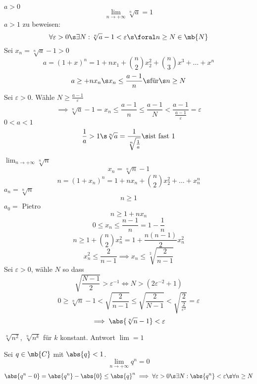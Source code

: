 \begin{Bsp}
  $a>0$
  \[\lim_{n\to+\infty}\sqrt[n]{a}=1\]
  $a>1$ zu beweisen:
  \[\forall \varepsilon>0 \s\exists N:\sqrt[n]{a}-1<\varepsilon\s\foral n\geq N\in\mb{N}\]
  Sei $x_n=\sqrt[n]{a}-1>0$
  \[a=(1+x)^n=1+nx_1+\binom{n}{2}x^2_2+\binom{n}{3}x^3+\dots+x^n\]
  \[a\geq +nx_n\s x_n\leq\frac{a-1}{n}\s\text{für}\s n\geq N\]
  Sei $\varepsilon>0$. Wähle $N\geq \frac{a-1}{\varepsilon}$
  \[\implies\sqrt[n]{a}-1=x_n\leq\frac{a-1}{n}\leq\frac{a-1}{N}<\frac{a-1}{\frac{a-1}{\varepsilon}}=\varepsilon\]
  $0<a<1$
  \[\frac{1}{a}>1\s\sqrt[n]{a}=\frac{1}{\sqrt[n]{\frac{1}{a}}}\s\text{ist fast 1}\]
\end{Bsp}
\begin{Bsp}
  $\lim_{n\to+\infty}\sqrt[n]{n}$
  \[x_n=\sqrt[n]{n}-1\]
  \[n=(1+x_n)^n=1+nx_n+\binom{n}{2}x_2^2+\dots+x_n^n\]
  $a_n=\sqrt[n]{n}$
  \[n\geq 1\]
  $a_0=$ Pietro %
  \[n\geq 1+nx_n\]
  \[0\leq x_n\leq\frac{n-1}{n}=1-\frac{1}{n}\]
  \[n\geq1+\binom{n}{2} x_n^2=1+\frac{n(n-1)}{2}x_n^2 \]
  \[x_n^2\leq\frac{2}{n-1}\implies x_n\leq \sqrt[2]{\frac{2}{n-1}}\]
  Sei $\varepsilon>0$, wähle $N$ so dass
  \[\sqrt{\frac{N-1}{2}}>\varepsilon^{-1}\iff N>\left( 2\varepsilon^{-2}+1 \right)\]
  \[0\geq\sqrt[n]{n}-1<\sqrt{\frac{2}{n-1}}\leq\sqrt{\frac{2}{N-1}}<\sqrt{\frac{2}{\frac{2}{\varepsilon^2}}}=\varepsilon\]
  \[\implies \abs{\sqrt[n]{n}-1}<\varepsilon\]
\end{Bsp}
\begin{Ueb}
  $\sqrt[n]{n^2}$, $\sqrt[n]{n^k}$ für $k$ konstant. Antwort $\lim = 1$
\end{Ueb}
\begin{Bsp}
  Sei $q\in\mb{C}$ mit $\abs{q}<1$.
  \[\lim_{n\to+\infty}q^n=0\]
  \[\abs{q^n-0}=\abs{q^n}-\abs{0}\leq\abs{q}^n\implies\forall \varepsilon>0\s \exists N:\abs{q^n}<\varepsilon\s\forall n\geq N\]
\end{Bsp}
